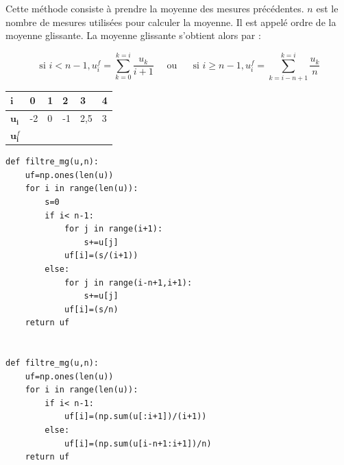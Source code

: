 Cette méthode consiste à prendre la moyenne des mesures précédentes. $n$ est le nombre de mesures utilisées pour calculer la moyenne. Il est appelé ordre de la moyenne glissante. La moyenne glissante s'obtient alors par :

$$
\text { si } i<n-1, u_{i}^{f}=\sum_{k=0}^{k=i} \frac{u_{k}}{i+1} \quad \text { ou } \quad \text { si } i \geq n-1, u_{i}^{f}=\sum_{k=i-n+1}^{k=i} \frac{u_{k}}{n}
$$


\fi

\ifprof
{
\renewcommand{\arraystretch}{3}
 \begin{center}
\begin{tabular}{p{}p{}p{}p{}p{}p{}}
\hline
\(\mathbf{i}\) & 0 & 1 & 2 & 3 & 4\\
\hline
\(\mathbf{u}_{\mathbf{i}}\) & -2 & 0 & -1 & 2,5 & 3\\
\hline
\(\mathbf{u}^f_{\mathbf{i}}\)&  &  &  &  &\\
\hline
\end{tabular}
 \end{center}

}

\else

\fi


\ifprof
\begin{texteCache}
\begin{lstlisting}
def filtre_mg(u,n):
	uf=np.ones(len(u))
	for i in range(len(u)):
		s=0
		if i< n-1:
			for j in range(i+1):
				s+=u[j]
			uf[i]=(s/(i+1))
		else:
			for j in range(i-n+1,i+1):
				s+=u[j]
			uf[i]=(s/n)
	return uf
	
	
def filtre_mg(u,n):
	uf=np.ones(len(u))
	for i in range(len(u)):
		if i< n-1:
			uf[i]=(np.sum(u[:i+1])/(i+1))
		else:
			uf[i]=(np.sum(u[i-n+1:i+1])/n)
	return uf
\end{lstlisting}



\end{texteCache}
\else



